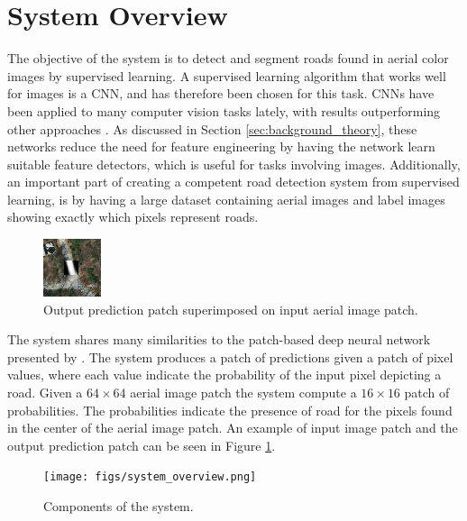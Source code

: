 \section{System Overview}
\label{sec:systemOverview}



The objective of the system is to detect and segment roads found in aerial color images by supervised learning. A supervised learning algorithm that works well for images is a \ac{CNN}, and has therefore been chosen for this task. \ac{CNN}s have been applied to many computer vision tasks lately, with results outperforming other approaches \citep{Krizhevsky_imagenet}. As discussed in Section \ref{sec:background_theory}, these networks reduce the need for feature engineering by having the network learn suitable feature detectors, which is useful for tasks involving images. Additionally, an important part of creating a competent road detection system from supervised learning, is by having a large dataset containing aerial images and label images showing exactly which pixels represent roads.\\

\begin{figure}[t]
\begin{center}
\includegraphics[width=0.15\columnwidth]{figs/labeloverlay.png}
\caption[Patches]{Output prediction patch superimposed on input aerial image patch.}
\label{fig:system_data_patch}
\end{center}
\end{figure}

The system shares many similarities to the patch-based deep neural network presented by \cite{Mnih_aerial_images_noisy}. The system produces a patch of predictions given a patch of pixel values, where each value indicate the probability of the input pixel depicting a road. Given a $64 \times 64$ aerial image patch the system compute a $16 \times 16$ patch of probabilities. The probabilities indicate the presence of road for the pixels found in the center of the aerial image patch. An example of input image patch and the output prediction patch can be seen in Figure \ref{fig:system_data_patch}.  \\

\begin{figure}[t]
\begin{center}
\texttt{[image: figs/system\_overview.png]}
\caption[Components of the system]{Components of the system.}
\label{fig:system_components}
\end{center}
\end{figure}

